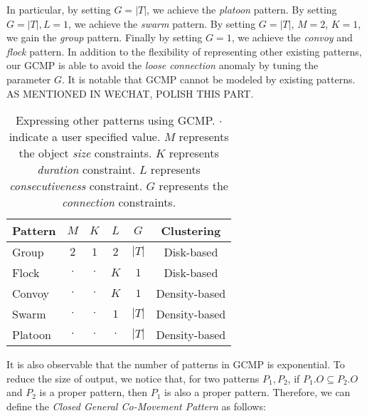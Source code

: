 In particular, by setting $G=|T|$, we achieve the \emph{platoon} pattern. By setting $G=|T|,L=1$, we achieve the \emph{swarm} pattern. By setting $G=|T|$, $M=2$, $K=1$, we gain the \emph{group} pattern. Finally by setting $G=1$, we achieve the \emph{convoy} and \emph{flock} pattern. 
In addition to the flexibility of representing other existing patterns, our GCMP is able to avoid the \emph{loose connection} anomaly by tuning the parameter $G$. 
%
It is notable that GCMP cannot be modeled by existing patterns. AS MENTIONED IN WECHAT, POLISH THIS PART.

\begin{table}
\centering
\begin{tabular}{|l|c|c|c|c|c|}
\hline 
Pattern & $M$ & $K$ & $L$ & $G$ & Clustering\\ 
\hline
Group & $2$ & $1$ & $2$ & $|T|$ & Disk-based\\
\hline
Flock & $\cdot$ & $\cdot$ & $K$ & $1$ & Disk-based \\
\hline 
Convoy & $\cdot$ & $\cdot$ & $K$ & $1$ & Density-based\\ 
\hline 
Swarm & $\cdot$ & $\cdot$ & $1$ & $|T|$ & Density-based \\ 
\hline 
Platoon & $\cdot$ & $\cdot$ & $\cdot$ & $|T|$ & Density-based\\ 
\hline 
\end{tabular} 
\caption{Expressing other patterns using GCMP. $\cdot$ indicate a user specified value. $M$ represents the 
object \emph{size} constraints. $K$ represents \emph{duration} constraint. $L$ represents \emph{consecutiveness} constraint. $G$ represents the \emph{connection} constraints.}
\label{tbl:patterns}
\end{table}
 
It is also observable that the number of patterns in GCMP is exponential. To reduce the size of output, 
we notice that, for two patterns $P_1,P_2$, if $P_1.O \subseteq P_2.O$ and $P_2$ is a proper pattern, then $P_1$ is also a proper pattern. Therefore, we can define the \emph{Closed General Co-Movement Pattern} as follows:

